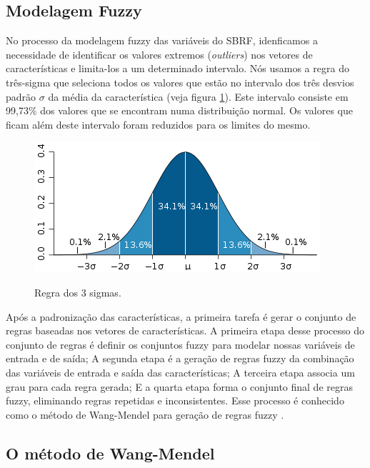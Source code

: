 \subsection{Modelagem Fuzzy}

No processo da modelagem fuzzy das variáveis do SBRF, idenficamos a necessidade de identificar os valores extremos (\textit{outliers}) nos vetores de características e limita-los a um determinado intervalo.  Nós usamos a regra do três-sigma \cite{kazmier2004schaum} que seleciona todos os valores que estão no intervalo dos três desvios padrão $\sigma$ da média da característica (veja figura \ref{figura:regra_3_sigmas}). Este intervalo consiste em 99,73\% dos valores que se encontram numa distribuição normal. Os valores que ficam além deste intervalo foram reduzidos para os limites do mesmo.

\begin{figure}[h]
\caption{Regra dos 3 sigmas.}
\centering
\includegraphics[scale=0.85]{regra-dos-3-sigma.png}
\label{figura:regra_3_sigmas}
\end{figure}

Após a padronização das características, a primeira tarefa é gerar o conjunto de regras baseadas nos vetores de características. A primeira etapa desse processo do conjunto de regras é definir os conjuntos fuzzy para modelar nossas variáveis de entrada e de saída;  A segunda etapa é a geração de regras fuzzy da combinação das variáveis de entrada e saída das características; A terceira etapa associa um grau para cada regra gerada; E a quarta etapa forma o conjunto final de regras fuzzy, eliminando regras repetidas e inconsistentes. Esse processo é conhecido como o método de Wang-Mendel para geração de regras fuzzy \cite{wang1992generating}.

\subsection{O método de Wang-Mendel}

